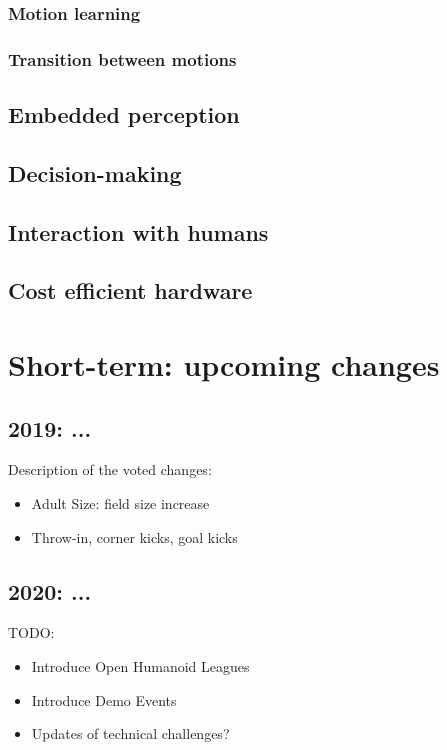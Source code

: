 \documentclass{article}
\begin{document}
\subsubsection{Motion learning}

\subsubsection{Transition between motions}



\subsection{Embedded perception}

\subsection{Decision-making}

\subsection{Interaction with humans}

\subsection{Cost efficient hardware}

\section{\label{sec:ShortTerm}Short-term: upcoming changes}

\subsection{2019: ...}

Description of the voted changes:
\begin{itemize}
\item Adult Size: field size increase
\item Throw-in, corner kicks, goal kicks
\end{itemize}

\subsection{2020: ...}

TODO: 
\begin{itemize}
\item Introduce Open Humanoid Leagues
\item Introduce Demo Events
\item Updates of technical challenges?
\end{itemize}
\end{document}
